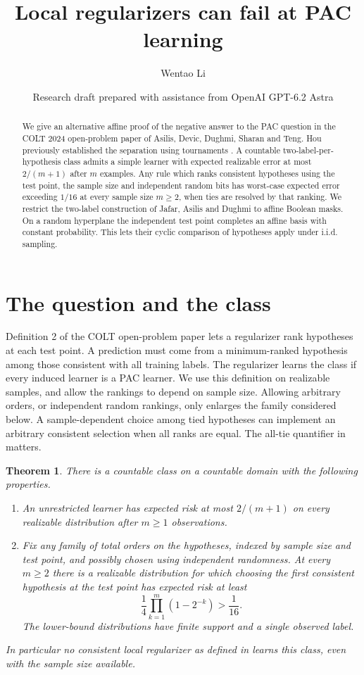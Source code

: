 \documentclass[11pt]{article}
\title{Local regularizers can fail at PAC learning}
\author{Wentao Li}
\date{Research draft prepared with assistance from OpenAI GPT-6.2 Astra}
\newtheorem{theorem}{Theorem}
\begin{document}
\maketitle
\begin{abstract}
We give an alternative affine proof of the negative answer to the PAC question in the COLT 2024 open-problem paper of Asilis, Devic, Dughmi, Sharan and Teng. Hou previously established the separation using tournaments \cite{hou}. A countable two-label-per-hypothesis class admits a simple learner with expected realizable error at most $2/(m+1)$ after $m$ examples. Any rule which ranks consistent hypotheses using the test point, the sample size and independent random bits has worst-case expected error exceeding $1/16$ at every sample size $m\ge2$, when ties are resolved by that ranking. We restrict the two-label construction of Jafar, Asilis and Dughmi to affine Boolean masks. On a random hyperplane the independent test point completes an affine basis with constant probability. This lets their cyclic comparison of hypotheses apply under i.i.d. sampling.
\end{abstract}

\section{The question and the class}
Definition 2 of the COLT open-problem paper \cite{open} lets a regularizer rank hypotheses at each test point. A prediction must come from a minimum-ranked hypothesis among those consistent with all training labels. The regularizer learns the class if every induced learner is a PAC learner. We use this definition on realizable samples, and allow the rankings to depend on sample size. Allowing arbitrary orders, or independent random rankings, only enlarges the family considered below. A sample-dependent choice among tied hypotheses can implement an arbitrary consistent selection when all ranks are equal. The all-tie quantifier in \cite{open} matters.

\begin{theorem}\label{thm}
There is a countable class on a countable domain with the following properties.
\begin{enumerate}
\item An unrestricted learner has expected risk at most $2/(m+1)$ on every realizable distribution after $m\ge1$ observations.
\item Fix any family of total orders on the hypotheses, indexed by sample size and test point, and possibly chosen using independent randomness. At every $m\ge2$ there is a realizable distribution for which choosing the first consistent hypothesis at the test point has expected risk at least
\[
 \frac{1}{4}\prod_{k=1}^{m}(1-2^{-k})>\frac1{16}.
\]
The lower-bound distributions have finite support and a single observed label.
\end{enumerate}
In particular no consistent local regularizer as defined in \cite{open} learns this class, even with the sample size available.
\end{theorem}
\end{document}
